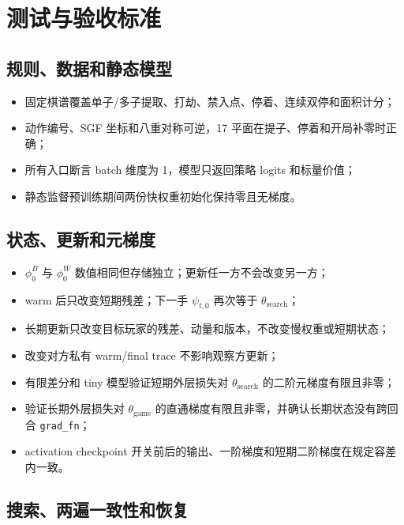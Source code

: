 \documentclass[UTF8,11pt,a4paper]{ctexart}
\newcommand{\gameinit}{\theta_{\mathrm{game}}}
\newcommand{\searchinit}{\theta_{\mathrm{search}}}
\newcommand{\code}[1]{\texttt{#1}}
\begin{document}
\section{测试与验收标准}

\subsection{规则、数据和静态模型}

\begin{itemize}
  \item 固定棋谱覆盖单子/多子提取、打劫、禁入点、停着、连续双停和面积计分；
  \item 动作编号、SGF 坐标和八重对称可逆，17 平面在提子、停着和开局补零时正确；
  \item 所有入口断言 batch 维度为 1，模型只返回策略 logits 和标量价值；
  \item 静态监督预训练期间两份快权重初始化保持零且无梯度。
\end{itemize}

\subsection{状态、更新和元梯度}

\begin{itemize}
  \item $\phi^B_0$ 与 $\phi^W_0$ 数值相同但存储独立；更新任一方不会改变另一方；
  \item warm 后只改变短期残差；下一手 $\psi_{t,0}$ 再次等于 $\searchinit$；
  \item 长期更新只改变目标玩家的残差、动量和版本，不改变慢权重或短期状态；
  \item 改变对方私有 warm/final trace 不影响观察方更新；
  \item 有限差分和 tiny 模型验证短期外层损失对 $\searchinit$ 的二阶元梯度有限且非零；
  \item 验证长期外层损失对 $\gameinit$ 的直通梯度有限且非零，并确认长期状态没有跨回合 \code{grad\_fn}；
  \item activation checkpoint 开关前后的输出、一阶梯度和短期二阶梯度在规定容差内一致。
\end{itemize}

\subsection{搜索、两遍一致性和恢复}
\end{document}
